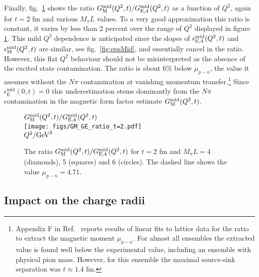 \documentclass[11pt,prd,aps,showpacs,eqsecnum,floatfix,nofootinbib,preprint,tightenlines]{revtex4}
\newcommand{\eV}[1]{\epsilon^{\rm mid}_{{\rm E},{#1}}}
\newcommand{\eM}{\epsilon^{\rm mid}_{\rm M}}
\newcommand{\GEmid}{G^{\rm mid}_{\rm E,4}}
\newcommand{\GMmid}{G^{\rm mid}_{\rm M}}
\begin{document}
Finally, fig.\ \ref{figGMmidOverGEmid} shows the ratio $\GMmid(Q^2,t)/\GEmid(Q^2,t)$ as a function of $Q^2$, again for $t=2$ fm and various $M_\pi L$ values. To a very good approximation this ratio is constant, it varies by less than 2 percent over the range of $Q^2$ displayed in figure \ref{figGMmidOverGEmid}. This mild $Q^2$ dependence is anticipated since the slopes of $\eV{4}(Q^2,t)$ and $\eM(Q^2,t)$ are similar, see fig.\ \ref{fig:epsMid}, and essentially cancel in the ratio. However, this flat $Q^2$ behaviour should not be misinterpreted as the absence of the excited state contamination. The ratio is about 6\% below $\mu_{p-n}$, the value it assumes without the $N\pi$ contamination at vanishing momentum transfer.\footnote{Appendix F in Ref.\ \cite{Djukanovic:2021cgp} reports results of linear fits to lattice data for the ratio to extract the magnetic moment $\mu_{p-n}$. For almost all ensembles the extracted value is found well below  the experimental value, including an ensemble with physical pion mass. However, for this ensemble the maximal source-sink separation was $t\approx1.4$ fm.} Since $ \epsilon_\text{E}^\text{mid}(0,t)=0$ this underestimation stems dominantly from the $N\pi$ contamination in the magnetic form factor estimate $\GMmid(Q^2,t)$.

% 
\begin{figure}[t]
\begin{center}
$\GMmid(Q^2,t)/\GEmid(Q^2,t)$\\[0.4ex]
\texttt{[image: figs/GM\_GE\_ratio\_t=2.pdf]}\\[0.4ex]
$Q^2/{\rm GeV}^2$\\[2ex]
\caption{\label{figGMmidOverGEmid} The ratio $\GMmid(Q^2,t)/\GEmid(Q^2,t)$ for $t=2$ fm and $M_{\pi}L=4$ (diamonds), 5 (squares) and 6 (circles). The dashed line shows the value $\mu_{p-n}=4.71$. 
}
\end{center}
\end{figure}

\subsection{Impact on the charge radii}\label{ssect:impactonradii}
\end{document}
